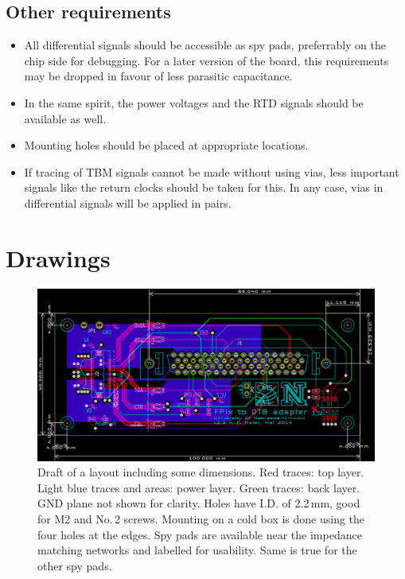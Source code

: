 \section{Other requirements}
\begin{itemize}
    \item All differential signals should be accessible as spy pads, preferrably on the chip side for debugging. For a later version of the board, this requirements may be dropped in favour of less parasitic capacitance.
    \item In the same spirit, the power voltages and the RTD signals should be available as well.
    \item Mounting holes should be placed at appropriate locations.
    \item If tracing of TBM signals cannot be made without using vias, less important signals like the return clocks should be taken for this. In any case, vias in differential signals will be applied in pairs.
\end{itemize}


\chapter{Drawings}


\begin{figure}[hbtp]
	\begin{center}
	\includegraphics[width=1.0\textwidth]{img/FPix2DTBadapterDrawing.png}
	\end{center}
	\caption{Draft of a layout including some dimensions. Red traces: top layer. Light blue traces and areas: power layer. Green traces: back layer. GND plane not shown for clarity. Holes have I.D. of 2.2\,mm, good for M2 and No.\,2 screws. Mounting on a cold box is done using the four holes at the edges. Spy pads are available near the impedance matching networks and labelled for usability. Same is true for the other spy pads.}
	\label{fig:FPix2DTBadapterDrawing}
\end{figure}

